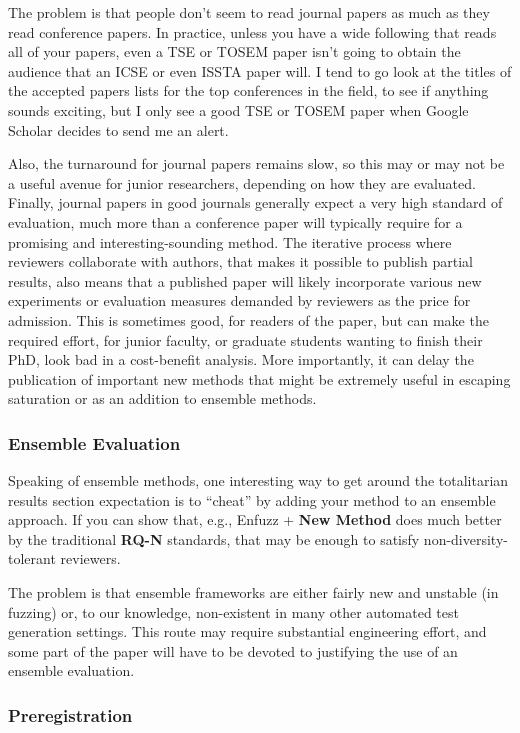 \documentclass[sigplan]{acmart}
\begin{document}
The problem is that people don't seem to read journal papers as much
as they read conference papers.  In practice, unless you have a wide
following that reads all of your papers, even a TSE or TOSEM paper
isn't going to obtain the audience that an ICSE or even ISSTA paper
will.  I tend to go look at the titles of the accepted papers lists for the
top conferences in the field, to see if anything sounds exciting, but I only see a good TSE or TOSEM
paper when Google Scholar decides to send me an alert.

Also, the turnaround for journal papers remains slow, so this
may or may not be a useful avenue for junior researchers, depending on
how they are evaluated.  Finally, journal papers in good journals generally expect a
very high standard of evaluation, much more than a conference paper
will typically require for a promising and interesting-sounding
method.  The iterative process where reviewers collaborate with
authors, that makes it possible to publish partial results, also means
that a published paper will likely incorporate various new experiments
or evaluation measures demanded by reviewers as the price for
admission.  This is sometimes good, for readers of the paper, but can make the required effort,
for junior faculty, or graduate students wanting to finish their PhD,
look bad in a cost-benefit analysis.  More importantly, it can delay
the publication of important new methods that might be extremely
useful in escaping saturation or as an addition to ensemble methods.

\subsubsection{Ensemble Evaluation}

Speaking of ensemble methods, one interesting way to get around the totalitarian results section
expectation is to ``cheat'' by adding your method to an ensemble
approach.  If you can show that, e.g., Enfuzz + {\bf New Method} does much
better by the traditional {\bf RQ-N} standards, that may be enough to
satisfy non-diversity-tolerant reviewers.

The problem is that ensemble frameworks are either fairly new and
unstable (in fuzzing) or, to our knowledge, non-existent in many other
automated test generation settings.  This route may require
substantial engineering effort, and some part of the paper will have
to be devoted to justifying the use of an ensemble evaluation.

\subsubsection{Preregistration}
\end{document}
